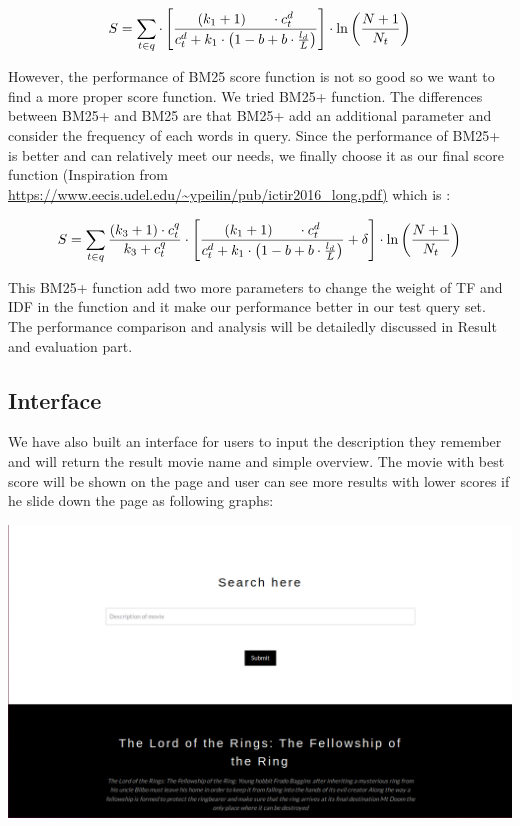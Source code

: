 \documentclass[letterpaper,10pt]{article}
\newenvironment{Figure}
  {\par\medskip\noindent\minipage{\linewidth}}
  {\endminipage\par\medskip}
\begin{document}
\begin{multicols}{2}
     {
    \tiny
    $$
        S = \sum_{t \in q} \cdot\left[\frac{\left(k_{1}+1\right) \\ \cdot c_{t}^{d}}{c_{t}^{d}+k_{1} \cdot\left(1-b+b \cdot \frac{l_{d}}{L}\right)}\right] \cdot \ln \left(\frac{N+1}{N_{t}}\right)
    $$
    }
    
    However, the performance of BM25 score function is not so good so we want to find a more proper score function. We tried BM25+ function. The differences between BM25+ and BM25 are that BM25+ add an additional parameter and consider the frequency of each words in query. Since the performance of BM25+ is better and can relatively meet our needs, we finally choose it as our final score function (Inspiration from \url{https://www.eecis.udel.edu/~ypeilin/pub/ictir2016_long.pdf)} which is :

    {
    \tiny
    $$
        S = \sum_{t \in q} \frac{\left(k_{3}+1\right) \cdot c_{t}^{q}}{k_{3}+c_{t}^{q}} \cdot\left[\frac{\left(k_{1}+1\right) \\ \cdot c_{t}^{d}}{c_{t}^{d}+k_{1} \cdot\left(1-b+b \cdot \frac{l_{d}}{L}\right)}+\delta\right] \cdot \ln \left(\frac{N+1}{N_{t}}\right)
    $$
    }


    This BM25+ function add two more parameters to change the weight of TF and IDF in the function and it make our performance better in our test query set. The performance comparison and analysis will be detailedly discussed in Result and evaluation part.

    \subsection{Interface }

    We have also built an interface for users to input the description they remember and will return the result movie name and simple overview. The movie with best score will be shown on the page and user can see more results with lower scores if he slide down the page as following graphs:
    
    \begin{Figure}
    	\center
  		\includegraphics[width=0.5\linewidth]{interface.jpg}
	\end{Figure}
	

\end{multicols}
\end{document}

